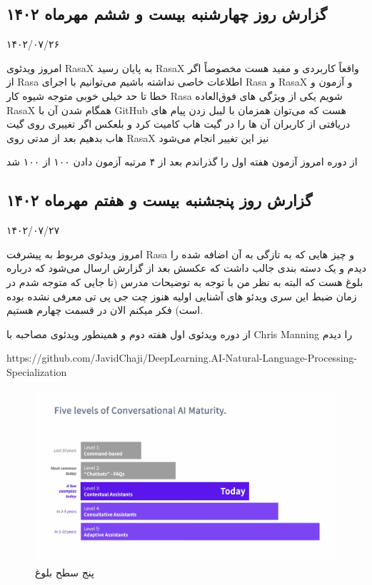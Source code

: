 \subsection{گزارش روز چهارشنبه بیست و ششم مهرماه ۱۴۰۲}

۱۴۰۲/۰۷/۲۶

امروز ویدئوی RasaX به پایان رسید RasaX واقعاً کاربردی و مفید هست مخصوصاً اگر از Rasa اطلاعات خاصی نداشته باشیم می‌توانیم با اجرای Rasa و RasaX و آزمون و خطا تا حد خیلی خوبی متوجه شیوه کار Rasa شویم یکی از ویژگی های فوق‌العاده RasaX همگام شدن آن با GitHub هست که می‌توان همزمان با لیبل زدن پیام های دریافتی از کاربران آن ها را در گیت هاب کامیت کرد و بلعکس اگر تغییری روی گیت هاب بدهیم بعد از مدتی روی RasaX نیز این تغییر انجام می‌شود

از دوره  امروز آزمون هفته اول را گذراندم بعد از ۴ مرتبه آزمون دادن ۱۰۰ از ۱۰۰ شد


\subsection{گزارش روز پنجشنبه بیست و هفتم مهرماه ۱۴۰۲}

۱۴۰۲/۰۷/۲۷

امروز ویدئوی مربوط به پیشرفت Rasa و چیز هایی که به تازگی به آن اضافه شده را دیدم و یک دسته بندی جالب داشت که عکسش بعد از گزارش ارسال می‌شود که درباره بلوغ  هست که البته به نظر من با توجه به توضیحات مدرس (تا جایی که متوجه شدم در زمان ضبط این سری ویدئو های آشنایی اولیه هنوز چت جی پی تی معرفی نشده بوده است) فکر میکنم الان در قسمت چهارم هستیم.

از دوره  ویدئوی اول هفته دوم و همینطور ویدئوی مصاحبه با Chris Manning را دیدم

https://github.com/JavidChaji/DeepLearning.AI-Natural-Language-Processing-Specialization


\begin{figure}[h]
    \includegraphics[width=\linewidth]{Images/Five_Level_of_Conversational_AI_Maturity.png}
    \caption{پنج سطح بلوغ }
\end{figure}



